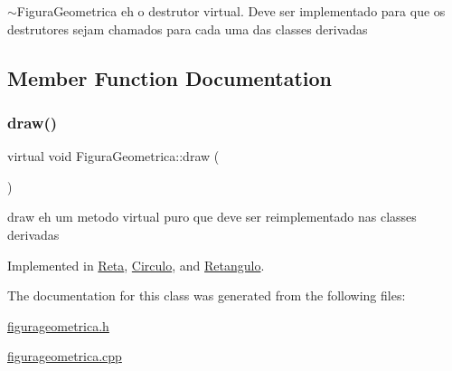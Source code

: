$\sim$\+Figura\+Geometrica eh o destrutor virtual. Deve ser implementado para que os destrutores sejam chamados para cada uma das classes derivadas 



\subsection{Member Function Documentation}
\mbox{\label{class_figura_geometrica_a727cea2befcb22b2457c088127fe041d}} 
\subsubsection{\texorpdfstring{draw()}{draw()}}
{\footnotesize\ttfamily virtual void Figura\+Geometrica\+::draw (\begin{DoxyParamCaption}{ }\end{DoxyParamCaption})\hspace{0.3cm}{\ttfamily [pure virtual]}}



draw eh um metodo virtual puro que deve ser reimplementado nas classes derivadas 



Implemented in \hyperlink{class_reta_a1c370279480f421bf617e5fbfbbb63a1}{Reta}, \hyperlink{class_circulo_aa94899872fb6c586d1343df1d9ce0d86}{Circulo}, and \hyperlink{class_retangulo_a48cb75fe7cd048727879c25485976444}{Retangulo}.



The documentation for this class was generated from the following files\+:\begin{DoxyCompactItemize}
\item 
\hyperlink{figurageometrica_8h}{figurageometrica.\+h}\item 
\hyperlink{figurageometrica_8cpp}{figurageometrica.\+cpp}\end{DoxyCompactItemize}

